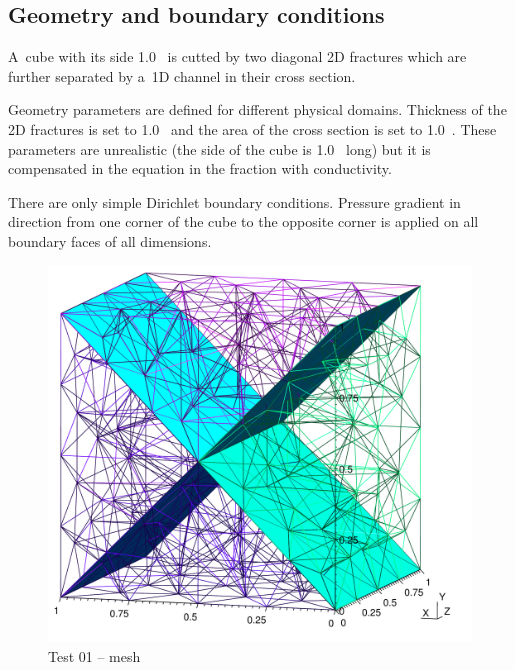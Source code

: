 \subsection*{Geometry and boundary conditions}
A~cube with its side 1.0~ is cutted by two diagonal 2D fractures which are further separated 
by a~1D channel in their cross section.

Geometry parameters are defined for different physical domains. Thickness of the 2D fractures is set to 
1.0~ and the area of the cross section is set to 1.0~. These parameters are 
unrealistic (the side of the cube is 1.0~ long) but it is compensated in the equation in 
the fraction with conductivity.

There are only simple Dirichlet boundary conditions. Pressure gradient in direction from one corner of the 
cube to the opposite corner is applied on all boundary faces of all dimensions.
%
\begin{figure}[htb!]
\centering
\includegraphics[width=13cm]{tests_graphics/01_mesh.pdf}
\caption{Test 01 -- mesh}
\label{fig:test1_mesh}
\end{figure}
%
%
